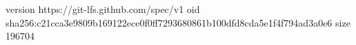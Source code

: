 version https://git-lfs.github.com/spec/v1
oid sha256:c21cca3e9809b169122ece0f0ff7293680861b100dfd8cda5e1f4f794ad3a0e6
size 196704
